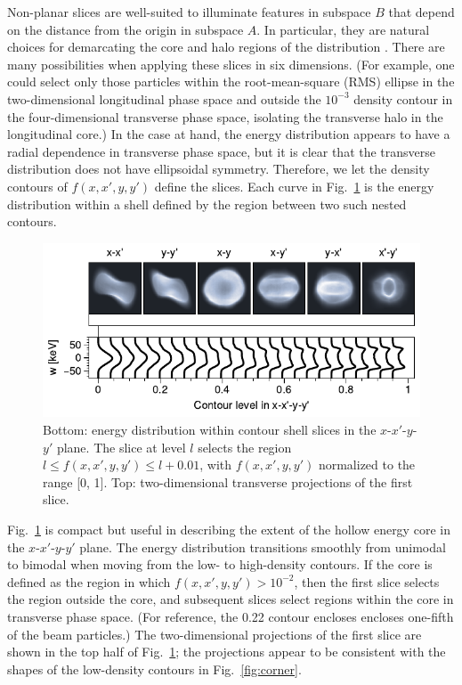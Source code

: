 \documentclass[%
 reprint,
 amsmath,amssymb,
 aps,
prstab,
]{revtex4-2}
\begin{document}
Non-planar slices are well-suited to illuminate features in subspace $B$ that depend on the distance from the origin in subspace $A$. In particular, they are natural choices for demarcating the core and halo regions of the distribution \cite{Aleksandrov2016-IPAC}. There are many possibilities when applying these slices in six dimensions. (For example, one could select only those particles within the root-mean-square (RMS) ellipse in the two-dimensional longitudinal phase space and outside the $10^{-3}$ density contour in the four-dimensional transverse phase space, isolating the transverse halo in the longitudinal core.) In the case at hand, the energy distribution appears to have a radial dependence in transverse phase space, but it is clear that the transverse distribution does not have ellipsoidal symmetry. Therefore, we let the density contours of $f(x, x', y, y')$ define the slices. Each curve in Fig.~\ref{fig:hollow_energy_b} is the energy distribution within a shell defined by the region between two such nested contours.
%
\begin{figure}[]
    \centering
    \includegraphics[width=\columnwidth]{fig6.pdf}
    \caption{Bottom: energy distribution within contour shell slices in the $x$-$x'$-$y$-$y'$ plane. The slice at level $l$ selects the region $l \le f(x, x', y, y') \le l + 0.01$, with $f(x, x', y, y')$ normalized to the range [0, 1]. Top: two-dimensional transverse projections of the first slice.}
    \label{fig:hollow_energy_b}
\end{figure}
%

Fig.~\ref{fig:hollow_energy_b} is compact but useful in describing the extent of the hollow energy core in the $x$-$x'$-$y$-$y'$ plane. The energy distribution transitions smoothly from unimodal to bimodal when moving from the low- to high-density contours. If the core is defined as the region in which $f(x, x', y, y') > 10^{-2}$, then the first slice selects the region outside the core, and subsequent slices select regions within the core in transverse phase space. (For reference, the 0.22 contour encloses encloses one-fifth of the beam particles.) The two-dimensional projections of the first slice are shown in the top half of Fig.~\ref{fig:hollow_energy_b}; the projections appear to be consistent with the shapes of the low-density contours in Fig.~\ref{fig:corner}.
\end{document}
